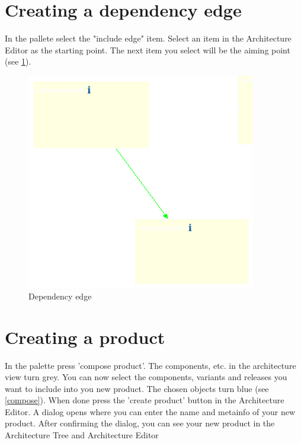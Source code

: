 \section{Creating a dependency edge}

In the pallete select the "include edge" item. Select an item in the Architecture Editor
as the starting point. The next item you select will be the aiming point (see \ref{include}).

\begin{figure}[h!]
\begin{center}
\includegraphics[width=10cm]{include.png}
   \caption{Dependency edge}
\label{include}
\end{center}
\end{figure}\par



\section{Creating a product}

In the palette press 'compose product'. The components, etc. in the architecture view turn
grey. You can now select the components, variants and releases you want to include into
you new product. The chosen objects turn blue (see \ref{compose}). When done press the 
'create product' button in the Architecture Editor. A dialog opens where you can enter
the name and metainfo of your new product. After confirming the dialog, you can see
your new product in the Architecture Tree and Architecture Editor

